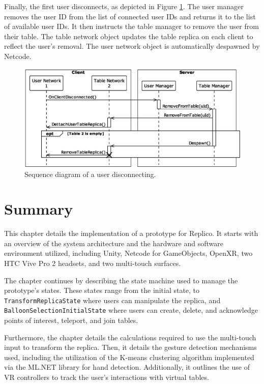         Finally, the first user disconnects, as depicted in Figure \ref{fig:disconnect}. The user manager removes the user ID from the list of connected user IDs and returns it to the list of available user IDs. It then instructs the table manager to remove the user from their table. The table network object updates the table replica on each client to reflect the user's removal. The user network object is automatically despawned by Netcode.

         \begin{figure}[h!]
            \centering
            \includegraphics[width=.85\linewidth]{diagrams/out/disconnect.eps}
            \caption{Sequence diagram of a user disconnecting.}
            \label{fig:disconnect}
        \end{figure}

\section{Summary}
    This chapter details the implementation of a prototype for Replico. It starts with an overview of the system architecture and the hardware and software environment utilized, including Unity, Netcode for GameObjects, OpenXR, two HTC Vive Pro 2 headsets, and two multi-touch surfaces.

    The chapter continues by describing the state machine used to manage the prototype's states. These states range from the initial state, to \lstinline{TransformReplicaState} where users can manipulate the replica, and \lstinline{BalloonSelectionInitialState} where users can create, delete, and acknowledge points of interest, teleport, and join tables.

    Furthermore, the chapter details the calculations required to use the multi-touch input to transform the replica. Then, it details the gesture detection mechanisms used, including the utilization of the K-means clustering algorithm implemented via the ML.NET library for hand detection. Additionally, it outlines the use of VR controllers to track the user's interactions with virtual tables.

